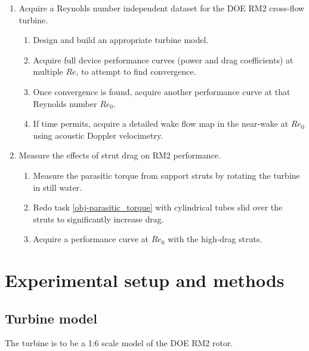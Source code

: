 \documentclass[12pt]{report}
\begin{document}
\begin{enumerate}

	\item Acquire a Reynolds number independent dataset for the DOE RM2 cross-flow
	turbine.

		\begin{enumerate}
			\item Design and build an appropriate turbine model.
		
			\item Acquire full device performance curves (power and drag coefficients) at
			multiple $Re$, to attempt to find convergence.
		  
			\item Once convergence is found, acquire another performance curve at that
			Reynolds number $Re_0$.
		
			\item If time permits, acquire a detailed wake flow map in the near-wake at
			$Re_0$ using acoustic Doppler velocimetry.
		\end{enumerate}
	
	\item Measure the effects of strut drag on RM2 performance.
	
	\begin{enumerate}
		\item Measure the parasitic torque from support struts by rotating the turbine
		in still water. \label{obj-parasitic_torque}
		
		\item Redo task \ref{obj-parasitic_torque} with cylindrical tubes slid over
		the struts to significantly increase drag.
		
		\item Acquire a performance curve at $Re_0$ with the high-drag struts. 
	\end{enumerate}
	
\end{enumerate}


\chapter{Experimental setup and methods}

\section{Turbine model}

The turbine is to be a 1:6 scale model of the DOE RM2 rotor.
\end{document}
